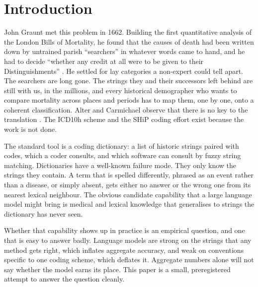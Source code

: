 \documentclass[11pt]{article}
\begin{document}
\section{Introduction}

John Graunt met this problem in 1662. Building the first quantitative analysis of the London Bills of Mortality, he found that the causes of death had been written down by untrained parish ``searchers'' in whatever words came to hand, and he had to decide ``whether any credit at all were to be given to their Distinguishments'' \citep{graunt1662}. He settled for lay categories a non-expert could tell apart. The searchers are long gone. The strings they and their successors left behind are still with us, in the millions, and every historical demographer who wants to compare mortality across places and periods has to map them, one by one, onto a coherent classification. Alter and Carmichael observe that there is no key to the translation \citep{alter1999classifying}. The ICD10h scheme \citep{reid2024icd10h} and the SHiP coding effort \citep{janssens2021ship} exist because the work is not done.

The standard tool is a coding dictionary: a list of historic strings paired with codes, which a coder consults, and which software can consult by fuzzy string matching. Dictionaries have a well-known failure mode. They only know the strings they contain. A term that is spelled differently, phrased as an event rather than a disease, or simply absent, gets either no answer or the wrong one from its nearest lexical neighbour. The obvious candidate capability that a large language model might bring is medical and lexical knowledge that generalises to strings the dictionary has never seen.

Whether that capability shows up in practice is an empirical question, and one that is easy to answer badly. Language models are strong on the strings that any method gets right, which inflates aggregate accuracy, and weak on conventions specific to one coding scheme, which deflates it. Aggregate numbers alone will not say whether the model earns its place. This paper is a small, preregistered attempt to answer the question cleanly.
\end{document}
